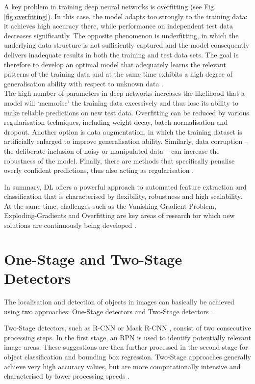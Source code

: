 A key problem in training deep neural networks is overfitting (see Fig. \ref{fig:overfitting}). In this case, the model adapts too strongly to the training data: it achieves high accuracy there, while performance on independent test data decreases significantly. The opposite phenomenon is underfitting, in which the underlying data structure is not sufficiently captured and the model consequently delivers inadequate results in both the training and test data sets. The goal is therefore to develop an optimal model that adequately learns the relevant patterns of the training data and at the same time exhibits a high degree of generalisation ability with respect to unknown data \cite{overfitting_pic}.\\
The high number of parameters in deep networks increases the likelihood that a model will ‘memorise’ the training data excessively and thus lose its ability to make reliable predictions on new test data. Overfitting can be reduced by various regularisation techniques, including weight decay, batch normalisation and dropout. Another option is data augmentation, in which the training dataset is artificially enlarged to improve generalisation ability. Similarly, data corruption – the deliberate inclusion of noisy or manipulated data – can increase the robustness of the model. Finally, there are methods that specifically penalise overly confident predictions, thus also acting as regularisation \cite{Alzubaidi2021}.

In summary, \acrlong{DL} offers a powerful approach to automated feature extraction and classification that is characterised by flexibility, robustness and high scalability. At the same time, challenges such as the Vanishing-Gradient-Problem, Exploding-Gradients and Overfitting are key areas of research for which new solutions are continuously being developed \cite{Alzubaidi2021}.
 








\section{One-Stage and Two-Stage Detectors}

The localisation and detection of objects in images can basically be achieved using two approaches: One-Stage detectors and Two-Stage detectors \cite{Soviany2018}.

Two-Stage detectors, such as \Acrfull{R-CNN} \cite{ren2016} or Mask \acrshort{R-CNN} \cite{he2018}, consist of two consecutive processing steps. In the first stage, an \Acrfull{RPN} is used to identify potentially relevant image areas. These suggestions are then further processed in the second stage for object classification and bounding box regression. Two-Stage approaches generally achieve very high accuracy values, but are more computationally intensive and characterised by lower processing speeds \cite{Soviany2018}.


